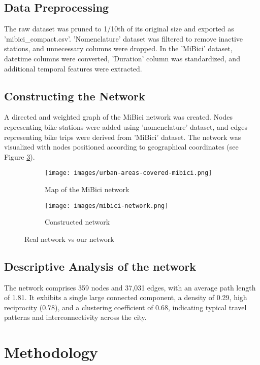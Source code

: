 \documentclass[conference]{IEEEtran}
\begin{document}
\subsection{Data Preprocessing}
The raw dataset was pruned to 1/10th of its original size and exported as 'mibici\_compact.csv'. 'Nomenclature' dataset was filtered to remove inactive stations, and unnecessary columns were dropped. In the 'MiBici' dataset, datetime columns were converted, 'Duration' column was standardized, and additional temporal features were extracted.

\subsection{Constructing the Network}
A directed and weighted graph of the MiBici network was created. Nodes representing bike stations were added using 'nomenclature' dataset, and edges representing bike trips were derived from 'MiBici' dataset. The network was visualized with nodes positioned according to geographical coordinates (see Figure \ref{fig:side_by_side}).

\begin{figure}[htbp]
    \centering
    \begin{subfigure}[b]{0.20\textwidth}
        \centering
        \texttt{[image: images/urban-areas-covered-mibici.png]}
        \caption{Map of the MiBici network}
        \label{fig:network}
    \end{subfigure}
    \hfill
    \begin{subfigure}[b]{0.20\textwidth}
        \centering
        \texttt{[image: images/mibici-network.png]}
        \caption{Constructed network}
        \label{fig:map}
    \end{subfigure}
    \caption{Real network vs our network}
    \label{fig:side_by_side}
\end{figure}

\subsection{Descriptive Analysis of the network}
The network comprises 359 nodes and 37,031 edges, with an average path length of 1.81. It exhibits a single large connected component, a density of 0.29, high reciprocity (0.78), and a clustering coefficient of 0.68, indicating typical travel patterns and interconnectivity across the city.


\section{Methodology}
\end{document}
